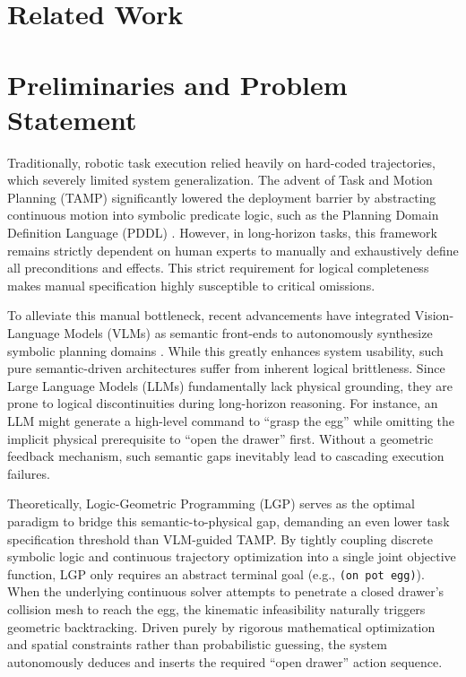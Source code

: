 \documentclass[journal]{IEEEtran}
\begin{document}
  \section{Related Work}

  \section{Preliminaries and Problem Statement}
  \label{sec:preliminaries}

  Traditionally, robotic task execution relied heavily on hard-coded trajectories,
  which severely limited system generalization. The advent of Task and Motion Planning
  (TAMP) significantly lowered the deployment barrier by abstracting continuous motion
  into symbolic predicate logic, such as the Planning Domain Definition Language
  (PDDL) \cite{cite_pddl_1998}. However, in long-horizon tasks, this framework remains
  strictly dependent on human experts to manually and exhaustively define all preconditions
  and effects. This strict requirement for logical completeness makes manual
  specification highly susceptible to critical omissions.

  To alleviate this manual bottleneck, recent advancements have integrated Vision-Language
  Models (VLMs) as semantic front-ends to autonomously synthesize symbolic planning domains
  \cite{cite_arxiv_2410_02193}. While this greatly enhances system usability, such
  pure semantic-driven architectures suffer from inherent logical brittleness.
  Since Large Language Models (LLMs) fundamentally lack physical grounding,
  they are prone to logical discontinuities during long-horizon reasoning.
  For instance, an LLM might generate a high-level command to ``grasp the egg'' while
  omitting the implicit physical prerequisite to ``open the drawer'' first.
  Without a geometric feedback mechanism, such semantic gaps inevitably lead to cascading
  execution failures.

  Theoretically, Logic-Geometric Programming (LGP) \cite{cite_lgp_2015} serves
  as the optimal paradigm to bridge this semantic-to-physical gap, demanding an even
  lower task specification threshold than VLM-guided TAMP. By tightly coupling
  discrete symbolic logic and continuous trajectory optimization into a single
  joint objective function, LGP only requires an abstract terminal goal (e.g.,
  \texttt{(on pot egg)}). When the underlying continuous solver attempts to penetrate
  a closed drawer's collision mesh to reach the egg, the kinematic infeasibility
  naturally triggers geometric backtracking. Driven purely by rigorous mathematical
  optimization and spatial constraints rather than probabilistic guessing, the
  system autonomously deduces and inserts the required ``open drawer'' action
  sequence.
\end{document}
